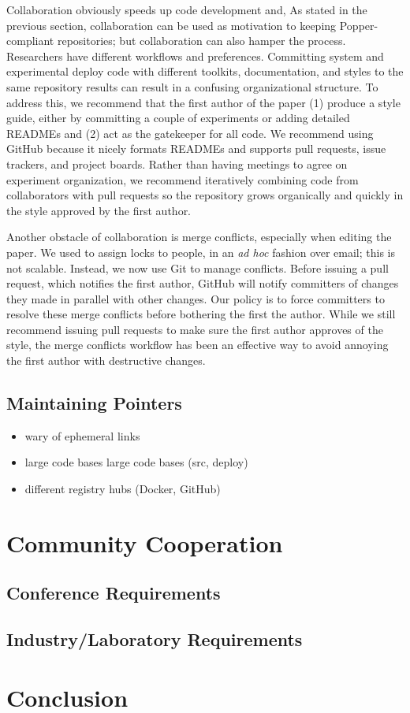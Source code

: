Collaboration obviously speeds up code development and, As stated in the
previous section, collaboration can be used as motivation to keeping
Popper-compliant repositories; but collaboration can also hamper the process.
Researchers have different workflows and preferences. Committing system and
experimental deploy code with different toolkits, documentation, and styles to
the same repository results can result in a confusing organizational structure.
To address this, we recommend that the first author of the paper (1) produce a
style guide, either by committing a couple of experiments or adding detailed
READMEs and (2) act as the gatekeeper for all code. We recommend using GitHub
because it nicely formats READMEs and supports pull requests, issue trackers,
and project boards. Rather than having meetings to agree on experiment
organization, we recommend iteratively combining code from collaborators with
pull requests so the repository grows organically and quickly in the style
approved by the first author.

Another obstacle of collaboration is merge conflicts, especially when editing
the paper. We used to assign locks to people, in an {\it ad hoc} fashion over
email; this is not scalable. Instead, we now use Git to manage conflicts.
Before issuing a pull request, which notifies the first author, GitHub will
notify committers of changes they made in parallel with other changes. Our
policy is to force committers to resolve these merge conflicts before bothering
the first the author. While we still recommend issuing pull requests to make
sure the first author approves of the style, the merge conflicts workflow has
been an effective way to avoid annoying the first author with destructive
changes.

\subsection{Maintaining Pointers}

\begin{itemize}
  \item wary of ephemeral links

  \item large code bases large code bases (src, deploy)

  \item different registry hubs (Docker, GitHub)
\end{itemize}

\section{Community Cooperation}

\subsection{Conference Requirements}

\subsection{Industry/Laboratory Requirements}

\section{Conclusion}
